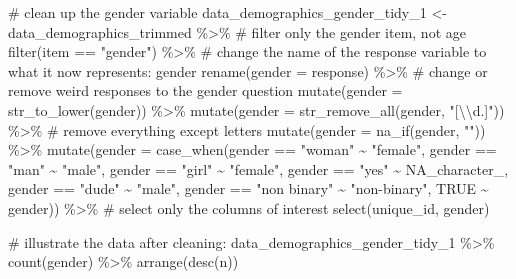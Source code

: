 \documentclass[
  letterpaper,
  DIV=11,
  numbers=noendperiod]{scrreprt}
\newenvironment{Shaded}{\begin{snugshade}}{\end{snugshade}}
\newcommand{\AttributeTok}[1]{\textcolor[rgb]{0.40,0.45,0.13}{#1}}
\newcommand{\CommentTok}[1]{\textcolor[rgb]{0.37,0.37,0.37}{#1}}
\newcommand{\ConstantTok}[1]{\textcolor[rgb]{0.56,0.35,0.01}{#1}}
\newcommand{\FunctionTok}[1]{\textcolor[rgb]{0.28,0.35,0.67}{#1}}
\newcommand{\NormalTok}[1]{\textcolor[rgb]{0.00,0.23,0.31}{#1}}
\newcommand{\OtherTok}[1]{\textcolor[rgb]{0.00,0.23,0.31}{#1}}
\newcommand{\SpecialCharTok}[1]{\textcolor[rgb]{0.37,0.37,0.37}{#1}}
\newcommand{\StringTok}[1]{\textcolor[rgb]{0.13,0.47,0.30}{#1}}
\begin{document}
\begin{Shaded}
\begin{Highlighting}[]
\CommentTok{\# clean up the gender variable}
\NormalTok{data\_demographics\_gender\_tidy\_1 }\OtherTok{\textless{}{-}}\NormalTok{ data\_demographics\_trimmed }\SpecialCharTok{\%\textgreater{}\%}
  \CommentTok{\# filter only the gender item, not age}
  \FunctionTok{filter}\NormalTok{(item }\SpecialCharTok{==} \StringTok{"gender"}\NormalTok{) }\SpecialCharTok{\%\textgreater{}\%}
  \CommentTok{\# change the name of the response variable to what it now represents: gender}
  \FunctionTok{rename}\NormalTok{(}\AttributeTok{gender =}\NormalTok{ response) }\SpecialCharTok{\%\textgreater{}\%}
  \CommentTok{\# change or remove weird responses to the gender question}
  \FunctionTok{mutate}\NormalTok{(}\AttributeTok{gender =} \FunctionTok{str\_to\_lower}\NormalTok{(gender)) }\SpecialCharTok{\%\textgreater{}\%}
  \FunctionTok{mutate}\NormalTok{(}\AttributeTok{gender =} \FunctionTok{str\_remove\_all}\NormalTok{(gender, }\StringTok{"[}\SpecialCharTok{\textbackslash{}\textbackslash{}}\StringTok{d.]"}\NormalTok{)) }\SpecialCharTok{\%\textgreater{}\%} \CommentTok{\# remove everything except letters}
  \FunctionTok{mutate}\NormalTok{(}\AttributeTok{gender =} \FunctionTok{na\_if}\NormalTok{(gender, }\StringTok{""}\NormalTok{)) }\SpecialCharTok{\%\textgreater{}\%} 
  \FunctionTok{mutate}\NormalTok{(}\AttributeTok{gender =} \FunctionTok{case\_when}\NormalTok{(gender }\SpecialCharTok{==} \StringTok{"woman"} \SpecialCharTok{\textasciitilde{}} \StringTok{"female"}\NormalTok{,}
\NormalTok{                            gender }\SpecialCharTok{==} \StringTok{"man"} \SpecialCharTok{\textasciitilde{}} \StringTok{"male"}\NormalTok{,}
\NormalTok{                            gender }\SpecialCharTok{==} \StringTok{"girl"} \SpecialCharTok{\textasciitilde{}} \StringTok{"female"}\NormalTok{,}
\NormalTok{                            gender }\SpecialCharTok{==} \StringTok{"yes"} \SpecialCharTok{\textasciitilde{}} \ConstantTok{NA\_character\_}\NormalTok{,}
\NormalTok{                            gender }\SpecialCharTok{==} \StringTok{"dude"} \SpecialCharTok{\textasciitilde{}} \StringTok{"male"}\NormalTok{,}
\NormalTok{                            gender }\SpecialCharTok{==} \StringTok{"non binary"} \SpecialCharTok{\textasciitilde{}} \StringTok{"non{-}binary"}\NormalTok{,}
                            \ConstantTok{TRUE} \SpecialCharTok{\textasciitilde{}}\NormalTok{ gender)) }\SpecialCharTok{\%\textgreater{}\%}
  \CommentTok{\# select only the columns of interest}
  \FunctionTok{select}\NormalTok{(unique\_id, gender)}

\CommentTok{\# illustrate the data after cleaning:}
\NormalTok{data\_demographics\_gender\_tidy\_1 }\SpecialCharTok{\%\textgreater{}\%}
  \FunctionTok{count}\NormalTok{(gender) }\SpecialCharTok{\%\textgreater{}\%}
  \FunctionTok{arrange}\NormalTok{(}\FunctionTok{desc}\NormalTok{(n))}
\end{Highlighting}
\end{Shaded}
\end{document}
